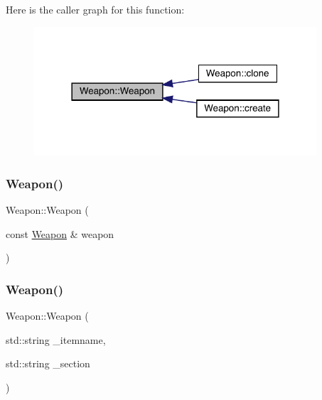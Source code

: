 Here is the caller graph for this function\+:
\nopagebreak
\begin{figure}[H]
\begin{center}
\leavevmode
\includegraphics[width=298pt]{class_weapon_a42dbc46dd70319a24763992c4ebbd396_icgraph}
\end{center}
\end{figure}
\mbox{\label{class_weapon_a167d8c34946b69123ddbb3ce7d739358}} 
\subsubsection{\texorpdfstring{Weapon()}{Weapon()}\hspace{0.1cm}{\footnotesize\ttfamily [3/4]}}
{\footnotesize\ttfamily Weapon\+::\+Weapon (\begin{DoxyParamCaption}\item[{const \mbox{\hyperlink{class_weapon}{Weapon}} \&}]{weapon }\end{DoxyParamCaption})}

\mbox{\label{class_weapon_a43fa490f1c719993d54294f1c3cf5f50}} 
\subsubsection{\texorpdfstring{Weapon()}{Weapon()}\hspace{0.1cm}{\footnotesize\ttfamily [4/4]}}
{\footnotesize\ttfamily Weapon\+::\+Weapon (\begin{DoxyParamCaption}\item[{std\+::string}]{\+\_\+itemname,  }\item[{std\+::string}]{\+\_\+section }\end{DoxyParamCaption})}

\mbox{\label{class_weapon_a420e7ba3d2017e6de3e93eb579cfd3fa}} 
